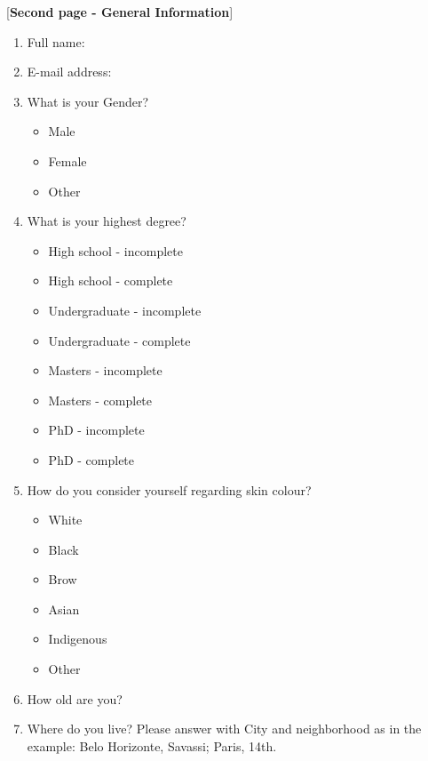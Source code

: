 \documentclass[a4paper, 12pt, openright, oneside, german, french, brazil, english]{abntex2}
\begin{document}
        [\textbf{Second page - General Information}] %

        \begin{enumerate}
        \item Full name: 
        \item E-mail address:

        \item What is your Gender?
          \begin{itemize}
          \item Male
          \item Female
          \item Other
          \end{itemize}

        \item What is your highest degree?
          \begin{itemize}
          \item High school - incomplete
          \item High school - complete
          \item Undergraduate - incomplete
          \item Undergraduate - complete
          \item Masters - incomplete
          \item Masters - complete
          \item PhD - incomplete
          \item PhD - complete
          \end{itemize}

        \item How do you consider yourself regarding skin colour?
          \begin{itemize}
          \item White
          \item Black
          \item Brow
          \item Asian
          \item Indigenous
          \item Other
          \end{itemize}

        \item How old are you?
          
        \item Where do you live? Please answer with City and neighborhood as in the example: Belo Horizonte, Savassi; Paris, 14th.
          

\end{enumerate}
\end{document}
